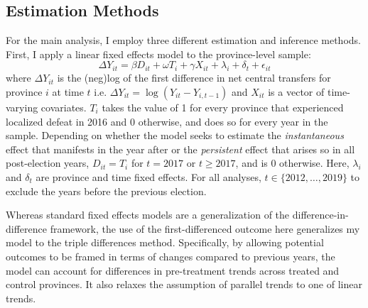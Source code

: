 \documentclass[12pt]{article}
\newcommand\fnote[1]{\footnote{\baselineskip=2\normalbaselineskip#1}}
\newcommand{\1}{\mathbbm{1}}
\let\footnote=\endnote
\begin{document}
\subsection*{Estimation Methods}
\label{sec:methods_estimation}

For the main analysis, I employ three different estimation and inference methods. First, I apply a linear fixed effects model to the province-level sample:
\begin{equation}
\Delta Y_{it} = \beta D_{it} + \omega T_{i} + \gamma X_{it} + \lambda_i + \delta_t + \epsilon_{it} \label{eq:FE}
\end{equation}
where $\Delta Y_{it}$ is the (neg)log of the first difference in net central transfers for province $i$ at time $t$ i.e. $\Delta Y_{it} = \log(Y_{it} - Y_{i, t-1})$ and $X_{it}$ is a vector of time-varying covariates. $T_{i}$ takes the value of 1 for every province that experienced localized defeat in 2016 and 0 otherwise, and does so for every year in the sample. Depending on whether the model seeks to estimate the \textit{instantaneous} effect that manifests in the year after or the \textit{persistent} effect that arises so in all post-election years, $D_{it} = T_{i}$ for $t=2017$ or $t\geq2017$, and is  $0$ otherwise. %
Here, $\lambda_i$ and $\delta_t$ are province and time fixed effects. For all analyses, $t \in \{2012, \ldots, 2019\}$ to exclude the years before the previous election.

Whereas standard fixed effects models are a generalization of the difference-in-difference framework, the use of the first-differenced outcome here generalizes my model to the triple differences method. Specifically, by allowing potential outcomes to be framed in terms of changes compared to previous years, the model can account for differences in pre-treatment trends across treated and control provinces. It also relaxes the assumption of parallel trends to one of linear trends.
\end{document}
